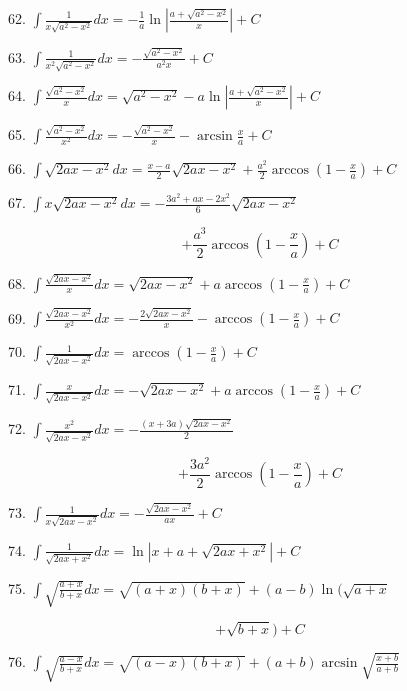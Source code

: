\documentclass[10pt]{article}
\begin{document}
62. \(\int \frac{1}{x\sqrt{{a}^{2} - {x}^{2}}}{dx} = - \frac{1}{a}\ln \left| \frac{a + \sqrt{{a}^{2} - {x}^{2}}}{x}\right| + C\)

63. \(\int \frac{1}{{x}^{2}\sqrt{{a}^{2} - {x}^{2}}}{dx} = - \frac{\sqrt{{a}^{2} - {x}^{2}}}{{a}^{2}x} + C\)

64. \(\int \frac{\sqrt{{a}^{2} - {x}^{2}}}{x}{dx} = \sqrt{{a}^{2} - {x}^{2}} - a\ln \left| \frac{a + \sqrt{{a}^{2} - {x}^{2}}}{x}\right| + C\)

65. \(\int \frac{\sqrt{{a}^{2} - {x}^{2}}}{{x}^{2}}{dx} = - \frac{\sqrt{{a}^{2} - {x}^{2}}}{x} - \arcsin \frac{x}{a} + C\)

66. \(\int \sqrt{{2ax} - {x}^{2}}{dx} = \frac{x - a}{2}\sqrt{{2ax} - {x}^{2}} + \frac{{a}^{2}}{2}\arccos \left( {1 - \frac{x}{a}}\right) + C\)

67. \(\int x\sqrt{{2ax} - {x}^{2}}{dx} = - \frac{3{a}^{2} + {ax} - 2{x}^{2}}{6}\sqrt{{2ax} - {x}^{2}}\)

\[
+ \frac{{a}^{3}}{2}\arccos \left( {1 - \frac{x}{a}}\right) + C
\]

68. \(\int \frac{\sqrt{{2ax} - {x}^{2}}}{x}{dx} = \sqrt{{2ax} - {x}^{2}} + a\arccos \left( {1 - \frac{x}{a}}\right) + C\)

69. \(\int \frac{\sqrt{{2ax} - {x}^{2}}}{{x}^{2}}{dx} = - \frac{2\sqrt{{2ax} - {x}^{2}}}{x} - \arccos \left( {1 - \frac{x}{a}}\right) + C\)

70. \(\int \frac{1}{\sqrt{{2ax} - {x}^{2}}}{dx} = \arccos \left( {1 - \frac{x}{a}}\right) + C\)

71. \(\int \frac{x}{\sqrt{{2ax} - {x}^{2}}}{dx} = - \sqrt{{2ax} - {x}^{2}} + a\arccos \left( {1 - \frac{x}{a}}\right) + C\)

72. \(\int \frac{{x}^{2}}{\sqrt{{2ax} - {x}^{2}}}{dx} = - \frac{\left( {x + {3a}}\right) \sqrt{{2ax} - {x}^{2}}}{2}\)

\[
+ \frac{3{a}^{2}}{2}\arccos \left( {1 - \frac{x}{a}}\right) + C
\]

73. \(\int \frac{1}{x\sqrt{{2ax} - {x}^{2}}}{dx} = - \frac{\sqrt{{2ax} - {x}^{2}}}{ax} + C\)

74. \(\int \frac{1}{\sqrt{{2ax} + {x}^{2}}}{dx} = \ln \left| {x + a + \sqrt{{2ax} + {x}^{2}}}\right| + C\)

75. \(\int \sqrt{\frac{a + x}{b + x}}{dx} = \sqrt{\left( {a + x}\right) \left( {b + x}\right) } + \left( {a - b}\right) \ln (\sqrt{a + x}\)

\[
+ \sqrt{b + x}) + C
\]

76. \(\int \sqrt{\frac{a - x}{b + x}}{dx} = \sqrt{\left( {a - x}\right) \left( {b + x}\right) } + \left( {a + b}\right) \arcsin \sqrt{\frac{x + b}{a + b}}\)
\end{document}
